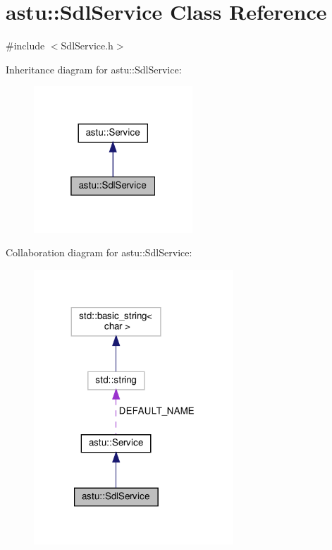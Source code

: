 \hypertarget{classastu_1_1SdlService}{}\section{astu\+:\+:Sdl\+Service Class Reference}
\label{classastu_1_1SdlService}


{\ttfamily \#include $<$Sdl\+Service.\+h$>$}



Inheritance diagram for astu\+:\+:Sdl\+Service\+:\nopagebreak
\begin{figure}[H]
\begin{center}
\leavevmode
\includegraphics[width=169pt]{classastu_1_1SdlService__inherit__graph}
\end{center}
\end{figure}


Collaboration diagram for astu\+:\+:Sdl\+Service\+:\nopagebreak
\begin{figure}[H]
\begin{center}
\leavevmode
\includegraphics[width=212pt]{classastu_1_1SdlService__coll__graph}
\end{center}
\end{figure}
